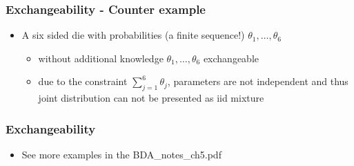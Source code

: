\documentclass[10pt]{beamer}
\begin{document}
\begin{frame}

\frametitle{Exchangeability - Counter example}

  \begin{itemize}
  \item A six sided die with probabilities (a finite sequence!)
    $\theta_1,\ldots,\theta_6$
    \begin{itemize}
    \item without additional knowledge $\theta_1,\ldots,\theta_6$
      exchangeable
    \item due to the constraint $\sum_{j=1}^6\theta_j$, parameters
      are not independent and thus joint distribution can not be
      presented as iid mixture
    \end{itemize}
  \end{itemize}
\end{frame}

 \begin{frame}

\frametitle{Exchangeability}

   \begin{itemize}
   \item See more examples in the BDA\_notes\_ch5.pdf
   \end{itemize}

 \end{frame}


\end{document}
